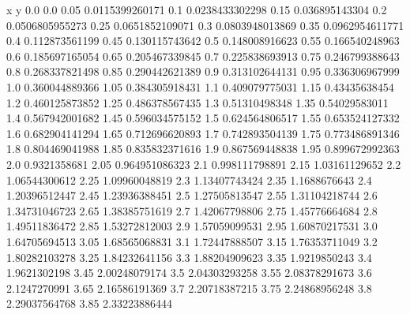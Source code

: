               x                y
            0.0              0.0
           0.05  0.0115399260171
            0.1  0.0238433302298
           0.15   0.036895143304
            0.2  0.0506805955273
           0.25  0.0651852109071
            0.3  0.0803948013869
           0.35  0.0962954611771
            0.4   0.112873561199
           0.45   0.130115743642
            0.5   0.148008916623
           0.55   0.166540248963
            0.6   0.185697165054
           0.65   0.205467339845
            0.7   0.225838693913
           0.75   0.246799388643
            0.8   0.268337821498
           0.85   0.290442621389
            0.9   0.313102644131
           0.95   0.336306967999
            1.0   0.360044889366
           1.05   0.384305918431
            1.1   0.409079775031
           1.15    0.43435638454
            1.2   0.460125873852
           1.25   0.486378567435
            1.3    0.51310498348
           1.35    0.54029583011
            1.4   0.567942001682
           1.45   0.596034575152
            1.5   0.624564806517
           1.55   0.653524127332
            1.6   0.682904141294
           1.65   0.712696620893
            1.7   0.742893504139
           1.75   0.773486891346
            1.8   0.804469041988
           1.85   0.835832371616
            1.9   0.867569448838
           1.95   0.899672992363
            2.0     0.9321358681
           2.05   0.964951086323
            2.1   0.998111798891
           2.15    1.03161129652
            2.2    1.06544300612
           2.25    1.09960048819
            2.3    1.13407743424
           2.35     1.1688676643
            2.4    1.20396512447
           2.45    1.23936388451
            2.5    1.27505813547
           2.55    1.31104218744
            2.6    1.34731046723
           2.65    1.38385751619
            2.7    1.42067798806
           2.75    1.45776664684
            2.8    1.49511836472
           2.85    1.53272812003
            2.9    1.57059099531
           2.95    1.60870217531
            3.0    1.64705694513
           3.05    1.68565068831
            3.1    1.72447888507
           3.15    1.76353711049
            3.2    1.80282103278
           3.25    1.84232641156
            3.3    1.88204909623
           3.35     1.9219850243
            3.4     1.9621302198
           3.45    2.00248079174
            3.5    2.04303293258
           3.55    2.08378291673
            3.6     2.1247270991
           3.65    2.16586191369
            3.7    2.20718387215
           3.75    2.24868956248
            3.8    2.29037564768
           3.85    2.33223886444

